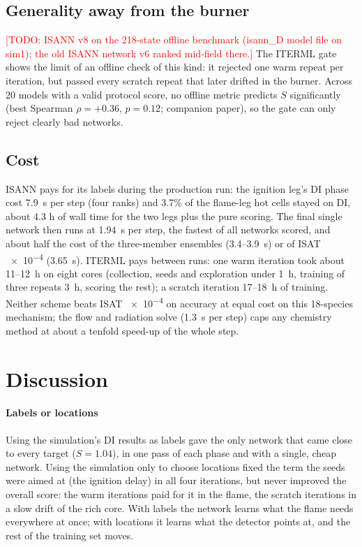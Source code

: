 \documentclass[preprint,review,12pt]{elsarticle}
\newcommand{\todo}[1]{\textcolor{red}{[TODO: #1]}}
\begin{document}
\subsection{Generality away from the burner}
\label{sec:offline}
\todo{ISANN v8 on the 218-state offline benchmark (isann\_D model file on sim1); the old ISANN network v6 ranked
mid-field there.} The ITERML gate shows the limit of an offline check of this kind: it rejected one warm repeat
per iteration, but passed every scratch repeat that later drifted in the burner. Across 20 models with a valid
protocol score, no offline metric predicts $S$ significantly (best Spearman $\rho=+0.36$, $p=0.12$; companion
paper), so the gate can only reject clearly bad networks.

\subsection{Cost}
\label{sec:cost}
ISANN pays for its labels during the production run: the ignition leg's DI phase cost 7.9~s per step (four
ranks) and 3.7\% of the flame-leg hot cells stayed on DI, about 4.3 h of wall time for the two legs plus the
pure scoring. The final single network then runs at 1.94~s per step, the fastest of all networks scored, and
about half the cost of the three-member ensembles (3.4--3.9~s) or of ISAT \num{e-4} (3.65~s). ITERML pays
between runs: one warm iteration took about 11--12~h on eight cores (collection, seeds and exploration under
1~h, training of three repeats 3~h, scoring the rest); a scratch iteration 17--18~h of training. Neither scheme
beats ISAT \num{e-4} on accuracy at equal cost on this 18-species mechanism; the flow and radiation solve
(1.3~s per step) caps any chemistry method at about a tenfold speed-up of the whole step.

\section{Discussion}
\label{sec:discussion}

\paragraph{Labels or locations} Using the simulation's DI results as labels gave the only network that came
close to every target ($S=1.04$), in one pass of each phase and with a single, cheap network. Using the
simulation only to choose locations fixed the term the seeds were aimed at (the ignition delay) in all four
iterations, but never improved the overall score: the warm iterations paid for it in the flame, the scratch
iterations in a slow drift of the rich core. With labels the network learns what the flame needs everywhere
at once; with locations it learns what the detector points at, and the rest of the training set moves.
\end{document}
